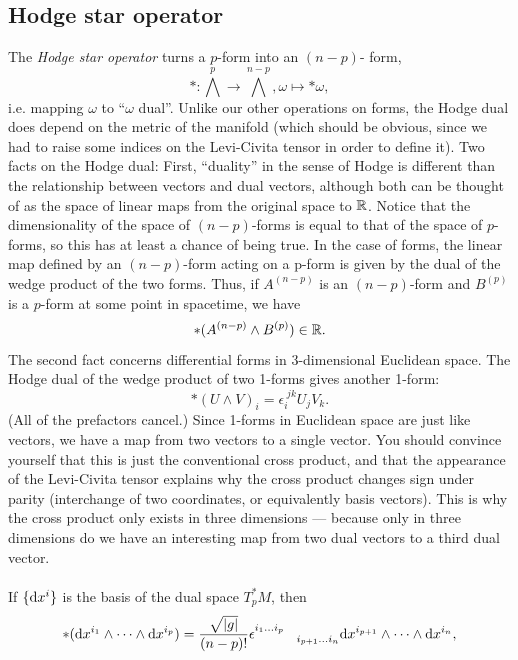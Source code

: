 \subsection{Hodge star operator}
The  \emph{Hodge star operator} turns a $p$-form into an $(n-p)$- form,
\begin{equation}
	*:\bigwedge^p \rightarrow \bigwedge^{n-p}, \omega \mapsto * \omega,
\end{equation}
i.e. mapping $\omega$ to “$\omega$ dual”. Unlike our other operations on forms, the Hodge dual does depend
on the metric of the manifold (which should be obvious, since we had to raise some indices
on the Levi-Civita tensor in order to define it). Two facts on the Hodge dual: First, “duality” in the sense of Hodge is different than the
relationship between vectors and dual vectors, although both can be thought of as the space
of linear maps from the original space to $\mathbb{R}$. Notice that the dimensionality of the space of
$(n − p)$-forms is equal to that of the space of $p$-forms, so this has at least a chance of being
true. In the case of forms, the linear map defined by an $(n − p)$-form acting on a p-form is
given by the dual of the wedge product of the two forms. Thus, if $A^{(n−p)}$ is an $(n − p)$-form
and $B^{(p)}$ is a $p$-form at some point in spacetime, we have
\begin{equation}
	*(A^{(n-p)}  \wedge B^{(p)}) \in \mathbb{R}.
\end{equation}
The second fact concerns differential forms in 3-dimensional Euclidean space. The Hodge
dual of the wedge product of two 1-forms gives another 1-form:
\begin{equation}
	*(U\wedge V)_i = \epsilon^{\; jk}_i U_j V_k.
\end{equation}
(All of the prefactors cancel.) Since 1-forms in Euclidean space are just like vectors, we have
a map from two vectors to a single vector. You should convince yourself that this is just the
conventional cross product, and that the appearance of the Levi-Civita tensor explains why
the cross product changes sign under parity (interchange of two coordinates, or equivalently
basis vectors). This is why the cross product only exists in three dimensions — because only
in three dimensions do we have an interesting map from two dual vectors to a third dual
vector.
\\
\\
If $\{\mathrm{d} x^i\}$ is the basis of the dual space $T^*_p M$, then
\begin{equation}
	*(\mathrm{d} x^{i_1} \wedge \dots \wedge \mathrm{d} x^{i_p}) = \frac{\sqrt{|g|}}{(n-p)!} \epsilon^{i_1 \dots i_p}_{\quad \quad \quad i_{p+1} \dots i_n} \mathrm{d} x^{i_{p+1}} \wedge \dots \wedge \mathrm{d} x^{i_n},
\end{equation}
